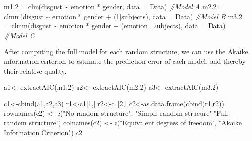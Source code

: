 \documentclass[
]{article}
\newenvironment{Shaded}{\begin{snugshade}}{\end{snugshade}}
\newcommand{\AttributeTok}[1]{\textcolor[rgb]{0.77,0.63,0.00}{#1}}
\newcommand{\CommentTok}[1]{\textcolor[rgb]{0.56,0.35,0.01}{\textit{#1}}}
\newcommand{\DecValTok}[1]{\textcolor[rgb]{0.00,0.00,0.81}{#1}}
\newcommand{\FloatTok}[1]{\textcolor[rgb]{0.00,0.00,0.81}{#1}}
\newcommand{\FunctionTok}[1]{\textcolor[rgb]{0.00,0.00,0.00}{#1}}
\newcommand{\NormalTok}[1]{#1}
\newcommand{\OtherTok}[1]{\textcolor[rgb]{0.56,0.35,0.01}{#1}}
\newcommand{\SpecialCharTok}[1]{\textcolor[rgb]{0.00,0.00,0.00}{#1}}
\newcommand{\StringTok}[1]{\textcolor[rgb]{0.31,0.60,0.02}{#1}}
\begin{document}
\begin{Shaded}
\begin{Highlighting}[]
\NormalTok{m1}\FloatTok{.2} \OtherTok{=} \FunctionTok{clm}\NormalTok{(disgust }\SpecialCharTok{\textasciitilde{}}\NormalTok{ emotion }\SpecialCharTok{*}\NormalTok{ gender, }\AttributeTok{data =}\NormalTok{ Data) }\CommentTok{\#Model A}
\NormalTok{m2}\FloatTok{.2} \OtherTok{=} \FunctionTok{clmm}\NormalTok{(disgust }\SpecialCharTok{\textasciitilde{}}\NormalTok{ emotion }\SpecialCharTok{*}\NormalTok{ gender }\SpecialCharTok{+}\NormalTok{ (}\DecValTok{1}\SpecialCharTok{|}\NormalTok{subjects), }\AttributeTok{data =}\NormalTok{ Data) }\CommentTok{\#Model B}
\NormalTok{m3}\FloatTok{.2} \OtherTok{=} \FunctionTok{clmm}\NormalTok{(disgust }\SpecialCharTok{\textasciitilde{}}\NormalTok{ emotion }\SpecialCharTok{*}\NormalTok{ gender }\SpecialCharTok{+}\NormalTok{ (emotion }\SpecialCharTok{|}\NormalTok{ subjects), }\AttributeTok{data =}\NormalTok{ Data) }\CommentTok{\#Model C}
\end{Highlighting}
\end{Shaded}

After computing the full model for each random structure, we can use the
Akaike information criterion to estimate the prediction error of each
model, and thereby their relative quality.

\begin{Shaded}
\begin{Highlighting}[]
\NormalTok{a1}\OtherTok{\textless{}{-}} \FunctionTok{extractAIC}\NormalTok{(m1}\FloatTok{.2}\NormalTok{)}
\NormalTok{a2}\OtherTok{\textless{}{-}} \FunctionTok{extractAIC}\NormalTok{(m2}\FloatTok{.2}\NormalTok{)}
\NormalTok{a3}\OtherTok{\textless{}{-}} \FunctionTok{extractAIC}\NormalTok{(m3}\FloatTok{.2}\NormalTok{)}

\NormalTok{c1}\OtherTok{\textless{}{-}}\FunctionTok{cbind}\NormalTok{(a1,a2,a3)}
\NormalTok{r1}\OtherTok{\textless{}{-}}\NormalTok{c1[}\DecValTok{1}\NormalTok{,]}
\NormalTok{r2}\OtherTok{\textless{}{-}}\NormalTok{c1[}\DecValTok{2}\NormalTok{,]}
\NormalTok{c2}\OtherTok{\textless{}{-}}\FunctionTok{as.data.frame}\NormalTok{(}\FunctionTok{cbind}\NormalTok{(r1,r2))}
\FunctionTok{rownames}\NormalTok{(c2) }\OtherTok{\textless{}{-}} \FunctionTok{c}\NormalTok{(}\StringTok{"No random structure"}\NormalTok{, }\StringTok{"Simple random strucure"}\NormalTok{,}\StringTok{"Full random structure"}\NormalTok{)}
\FunctionTok{colnames}\NormalTok{(c2) }\OtherTok{\textless{}{-}} \FunctionTok{c}\NormalTok{(}\StringTok{"Equivalent degrees of freedom"}\NormalTok{, }\StringTok{"Akaike Information Criterion"}\NormalTok{)}
\NormalTok{c2}
\end{Highlighting}
\end{Shaded}
\end{document}
